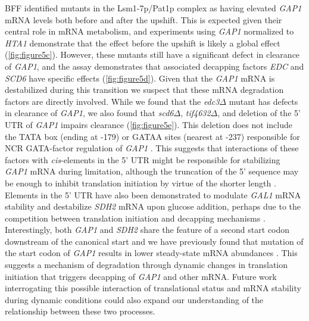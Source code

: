BFF identified mutants in the Lsm1-7p/Pat1p
complex as having elevated \textit{GAP1} mRNA levels both before and after the
upshift. This is expected given their central role in mRNA 
metabolism, and experiments using \textit{GAP1} normalized to
\textit{HTA1} demonstrate that the effect before the upshift is
likely a global effect (\autoref{fig:figure5c}). 
However, these mutants still have a
significant defect in clearance of \textit{GAP1},
and the assay demonstrates that associated decapping factors 
\textit{EDC} and \textit{SCD6} have specific effects
(\autoref{fig:figure5d}).
Given that the \textit{GAP1} mRNA is destabilized during this
transition we suspect that these mRNA degradation factors are
directly involved. 
While we found that the \textit{edc3}$\Delta$ mutant has defects in
clearance of \textit{GAP1}, we also 
found that \textit{scd6}$\Delta$,
\textit{tif4632}$\Delta$, and deletion of the 5' UTR
of \textit{GAP1} impairs clearance (\autoref{fig:figure5e}). 
This deletion does not include the TATA box (ending at -179) or
GATAA sites (nearest at -237) responsible for NCR GATA-factor
regulation of \textit{GAP1} \parencite{stanbrough1996two}.
This suggests that interactions of
these factors with \textit{cis}-elements in the 5’ UTR might be responsible for
stabilizing \textit{GAP1} mRNA during limitation, although the 
truncation of the 5' sequence may be enough to inhibit translation 
initiation by virtue of the shorter length
\parencite{arribere2013roles}.
Elements in the 5’ UTR have
also been demonstrated to modulate \textit{GAL1} mRNA stability
\parencite{baumgartner2011antagonistic} and destabilize \textit{SDH2} mRNA upon glucose
addition, perhaps due to the competition between translation
initiation and decapping mechanisms \parencite{de2002role}.
Interestingly, both \textit{GAP1} and \textit{SDH2} 
share the feature of a second start
codon downstream of the canonical start
\parencite{neymotin2016multiple} and
we have previously found that mutation of
the start codon of \textit{GAP1} results in lower
steady-state mRNA abundances \parencite{neymotin2016multiple}.
This
suggests a mechanism of degradation through dynamic changes in 
translation initiation that triggers decapping of \textit{GAP1} 
and other mRNA. 
Future work interrogating
this possible interaction of translational status and mRNA
stability during dynamic conditions could also expand our understanding of
the relationship between these two processes.

